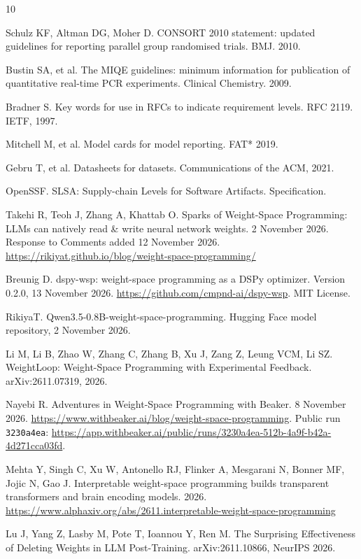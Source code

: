 \documentclass[11pt]{article}
\begin{document}
\begin{thebibliography}{10}

 Schulz KF, Altman DG, Moher D. CONSORT 2010 statement:
  updated guidelines for reporting parallel group randomised trials. BMJ. 2010.

 Bustin SA, et al. The MIQE guidelines: minimum information for
  publication of quantitative real-time PCR experiments. Clinical Chemistry.
  2009.

 Bradner S. Key words for use in RFCs to indicate requirement
  levels. RFC 2119. IETF, 1997.

 Mitchell M, et al. Model cards for model reporting. FAT*
  2019.

 Gebru T, et al. Datasheets for datasets. Communications of
  the ACM, 2021.

 OpenSSF. SLSA: Supply-chain Levels for Software Artifacts.
  Specification.

 Takehi R, Teoh J, Zhang A, Khattab O. Sparks of Weight-Space
  Programming: LLMs can natively read \& write neural network weights. 2
  November 2026. Response to Comments added 12 November 2026.
  \url{https://rikiyat.github.io/blog/weight-space-programming/}

 Breunig D. dspy-wsp: weight-space programming as a DSPy
  optimizer. Version 0.2.0, 13 November 2026.
  \url{https://github.com/cmpnd-ai/dspy-wsp}. MIT License.

 RikiyaT. Qwen3.5-0.8B-weight-space-programming. Hugging Face
  model repository, 2 November 2026.

 Li M, Li B, Zhao W, Zhang C, Zhang B, Xu J, Zang Z, Leung
  VCM, Li SZ. WeightLoop: Weight-Space Programming with Experimental Feedback.
  arXiv:2611.07319, 2026.

 Nayebi R. Adventures in Weight-Space Programming with Beaker.
  8 November 2026.
  \url{https://www.withbeaker.ai/blog/weight-space-programming}. Public run
  \texttt{3230a4ea}:
  \url{https://app.withbeaker.ai/public/runs/3230a4ea-512b-4a9f-b42a-4d271cca03fd}.

 Mehta Y, Singh C, Xu W, Antonello RJ, Flinker A, Mesgarani N,
  Bonner MF, Jojic N, Gao J. Interpretable weight-space programming builds
  transparent transformers and brain encoding models. 2026.
  \url{https://www.alphaxiv.org/abs/2611.interpretable-weight-space-programming}

 Lu J, Yang Z, Lasby M, Pote T, Ioannou Y, Ren M. The
  Surprising Effectiveness of Deleting Weights in LLM Post-Training.
  arXiv:2611.10866, NeurIPS 2026.

\end{thebibliography}
\end{document}

